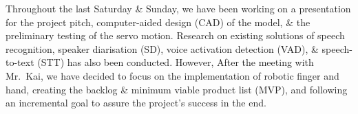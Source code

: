\newpage


Throughout the last Saturday \& Sunday, we have been working on a presentation for the project pitch, computer-aided design (CAD) of the model, \& the preliminary testing of the servo motion. Research on existing solutions of speech recognition, speaker diarisation (SD), voice activation detection (VAD), \& speech-to-text (STT) has also been conducted. However, After the meeting with Mr.~Kai, we have decided to focus on the implementation of robotic finger and hand, creating the backlog \& minimum viable product list (MVP), and following an incremental goal to assure the project's success in the end.

\newpage